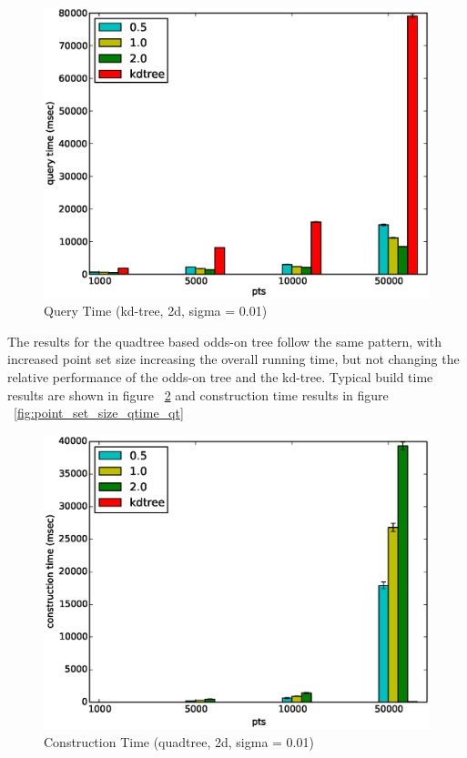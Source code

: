 \documentclass[mcs]{scsthesis}
\begin{document}
\begin{figure}
\begin{center}
\includegraphics[scale=0.5]{diagrams/2d_group_bypts_sigma0.01_qtime.eps}
\caption{Query Time (kd-tree, 2d, sigma = 0.01)}
\label{fig:point_set_size_qtime}
\end{center}
\end{figure}

The results for the quadtree based odds-on tree follow the same pattern, with
increased point set size increasing the overall running time, but not changing
the relative performance of the odds-on tree and the kd-tree. Typical build
time results are shown in figure ~\ref{fig:point_set_size_ctime_qt} and
construction time results in figure ~\ref{fig:point_set_size_qtime_qt}  

\begin{figure}
\begin{center}
\includegraphics[scale=0.5]{diagrams/2d_group_bypts_sigma0.01_ctime_qt.eps}
\caption{Construction Time (quadtree, 2d, sigma = 0.01)}
\label{fig:point_set_size_ctime_qt}
\end{center}
\end{figure}
\end{document}
